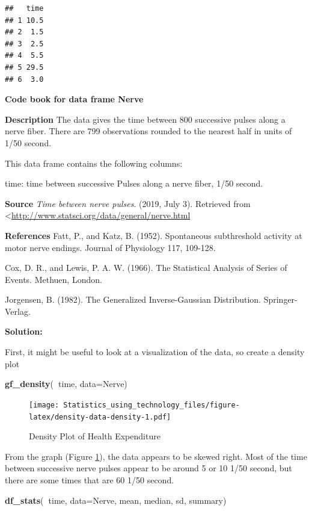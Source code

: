 \documentclass[]{book}
\newenvironment{Shaded}{\begin{snugshade}}{\end{snugshade}}
\newcommand{\DataTypeTok}[1]{\textcolor[rgb]{0.13,0.29,0.53}{#1}}
\newcommand{\KeywordTok}[1]{\textcolor[rgb]{0.13,0.29,0.53}{\textbf{#1}}}
\newcommand{\NormalTok}[1]{#1}
\newcommand{\OperatorTok}[1]{\textcolor[rgb]{0.81,0.36,0.00}{\textbf{#1}}}
\begin{document}
\begin{verbatim}
##   time
## 1 10.5
## 2  1.5
## 3  2.5
## 4  5.5
## 5 29.5
## 6  3.0
\end{verbatim}

\textbf{Code book for data frame Nerve}

\textbf{Description}
The data gives the time between 800 successive pulses along a nerve fiber. There are 799 observations rounded to the nearest half in units of 1/50 second.

This data frame contains the following columns:

time: time between successive Pulses along a nerve fiber, 1/50 second.

\textbf{Source}
\emph{Time between nerve pulses}. (2019, July 3). Retrieved from
\textless{}\url{http://www.statsci.org/data/general/nerve.html}

\textbf{References}
Fatt, P., and Katz, B. (1952). Spontaneous subthreshold activity at motor nerve endings. Journal of Physiology 117, 109-128.

Cox, D. R., and Lewis, P. A. W. (1966). The Statistical Analysis of Series of Events. Methuen, London.

Jorgensen, B. (1982). The Generalized Inverse-Gaussian Distribution. Springer-Verlag.

\textbf{Solution:}

First, it might be useful to look at a visualization of the data, so create a density plot



\begin{Shaded}
\begin{Highlighting}[]
\KeywordTok{gf_density}\NormalTok{(}\OperatorTok{~}\NormalTok{time, }\DataTypeTok{data=}\NormalTok{Nerve)}
\end{Highlighting}
\end{Shaded}

\begin{figure}
\centering
\texttt{[image: Statistics\_using\_technology\_files/figure-latex/density-data-density-1.pdf]}
\caption{\label{fig:density-data-density}Density Plot of Health Expenditure}
\end{figure}

From the graph (Figure \ref{fig:density-data-density}), the data appears to be skewed right. Most of the time between successive nerve pulses appear to be around 5 or 10 1/50 second, but there are some times that are 60 1/50 second.

\begin{Shaded}
\begin{Highlighting}[]
\KeywordTok{df_stats}\NormalTok{(}\OperatorTok{~}\NormalTok{time, }\DataTypeTok{data=}\NormalTok{Nerve, mean, median, sd, summary)}
\end{Highlighting}
\end{Shaded}
\end{document}
